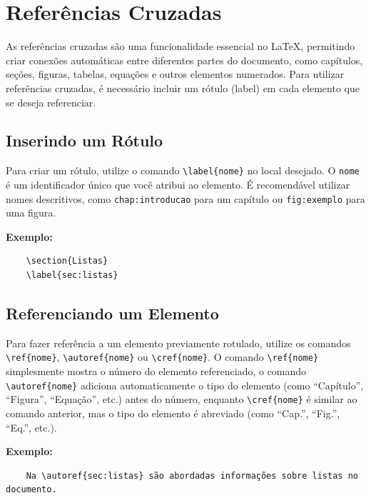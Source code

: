 \section{Referências Cruzadas}
\label{sec:referenciasCruzadas}

As referências cruzadas são uma funcionalidade essencial no \LaTeX{}, permitindo criar conexões automáticas entre diferentes partes do documento, como capítulos, seções, figuras, tabelas, equações e outros elementos numerados. Para utilizar referências cruzadas, é necessário incluir um rótulo ({\ttfamily label}) em cada elemento que se deseja referenciar.

\subsection{Inserindo um Rótulo}
Para criar um rótulo, utilize o comando \verb|\label{nome}| no local desejado. O \verb|nome| é um identificador único que você atribui ao elemento. É recomendável utilizar nomes descritivos, como \verb|chap:introducao| para um capítulo ou \verb|fig:exemplo| para uma figura. 

\textbf{Exemplo:}
\begin{verbatim}
    \section{Listas}
    \label{sec:listas}
\end{verbatim}

\subsection{Referenciando um Elemento}
Para fazer referência a um elemento previamente rotulado, utilize os comandos \verb|\ref{nome}|, \verb|\autoref{nome}| ou \verb|\cref{nome}|. O comando \verb|\ref{nome}| simplesmente mostra o número do elemento referenciado, o comando \verb|\autoref{nome}| adiciona automaticamente o tipo do elemento (como ``Capítulo'', ``Figura'', ``Equação'', etc.) antes do número, enquanto \verb|\cref{nome}| é similar ao comando anterior, mas o tipo do elemento é abreviado (como ``Cap.'', ``Fig.'', ``Eq.'', etc.).

\textbf{Exemplo:}
\begin{verbatim}
    Na \autoref{sec:listas} são abordadas informações sobre listas no documento.
\end{verbatim}

